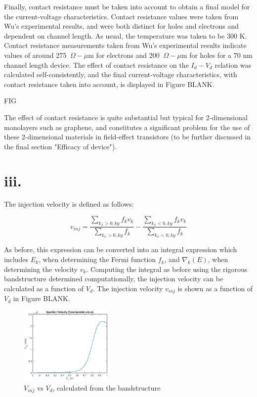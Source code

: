 \documentclass[11pt]{article}
\begin{document}
Finally, contact resistance must be taken into account to obtain a final model for the current-voltage characteristics. Contact resistance values were taken from Wu's experimental results, and were both distinct for holes and electrons and dependent on channel length. As usual, the temperature was taken to be 300 K. Contact resistance measurements taken from Wu's experimental results indicate values of around 275 $~\Omega -\mu$m for electrons and 200 $~\Omega -\mu$m for holes for a 70 nm channel length device. The effect of contact resistance on the $I_d-V_d$ relation was calculated self-consistently, and the final current-voltage characteristics, with contact resistance taken into account, is displayed in Figure BLANK.

FIG

The effect of contact resistance is quite substantial but typical for 2-dimensional monolayers such as graphene, and constitutes a significant problem for the use of these 2-dimensional materials in field-effect transistors (to be further discussed in the final section "Efficacy of device").

\section*{iii.} The injection velocity is defined as follows:

$$v_{inj} = \frac{\sum_{k_x>0, ky}f_{k}v_{k}}{\sum_{k_x>0, ky}f_{k}} - \frac{\sum_{k_x<0, ky}f_{k}v_{k}}{\sum_{k_x<0, ky}f_{k}}$$

As before, this expression can be converted into an integral expression which includes $E_k$, when determining the Fermi function $f_{k}$, and $\nabla_k(E)$, when determining the velocity $v_{k}$.  Computing the integral as before using the rigorous bandstructure determined computationally, the injection velocity can be calculated as a function of $V_d$. The injection velocity $v_{inj}$ is shown as a function of $V_d$ in Figure BLANK.

\begin{figure}[h!]
\centering 
\includegraphics[width=0.4\textwidth]{vinj_saturate.eps}
\caption{$V_{inj}$ vs $V_d$, calculated from the bandstructure}\label{fig:FET}
\end{figure}
\end{document}

